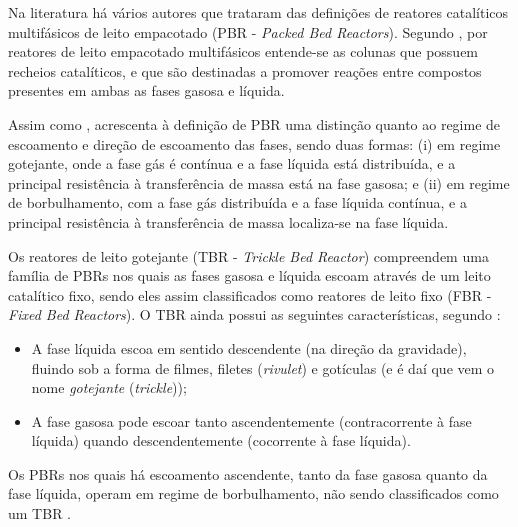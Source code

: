 Na literatura há vários autores que trataram das definições de
reatores catalíticos multifásicos de leito empacotado (PBR - \emph{Packed Bed
Reactors}).
Segundo , por reatores de leito empacotado multifásicos
entende-se as colunas que possuem recheios catalíticos, e que são destinadas a
promover reações entre compostos presentes em ambas as fases gasosa e líquida.

Assim como ,  acrescenta à
definição de PBR uma distinção quanto ao regime de escoamento e direção de
escoamento das fases, sendo duas formas: (i) em regime gotejante, onde a fase
gás é contínua e a fase líquida está distribuída, e a principal resistência à
transferência de massa está na fase gasosa; e (ii) em regime de borbulhamento,
com a fase gás distribuída e a fase líquida contínua, e a principal resistência
à transferência de massa localiza-se na fase líquida.

Os reatores de leito gotejante (TBR - \emph{Trickle Bed Reactor}) compreendem
uma família de PBRs nos quais as fases gasosa e líquida escoam através de um
leito catalítico fixo, sendo eles assim classificados como reatores de leito
fixo (FBR - \emph{Fixed Bed Reactors}). O TBR ainda possui as seguintes
características, segundo :

\begin{itemize}
\item A fase líquida escoa em sentido descendente (na direção da gravidade),
fluindo sob a forma de filmes, filetes (\emph{rivulet}) e gotículas (e é daí
que vem o nome \textit{gotejante} (\emph{trickle}));
\item A fase gasosa pode escoar tanto ascendentemente (contracorrente à
fase líquida) quando descendentemente (cocorrente à fase líquida).
\end{itemize}

Os PBRs nos quais há escoamento ascendente, tanto da fase gasosa quanto da
fase líquida, operam em regime de borbulhamento, não sendo classificados como
um TBR \cite{Ancheyta2011}.




